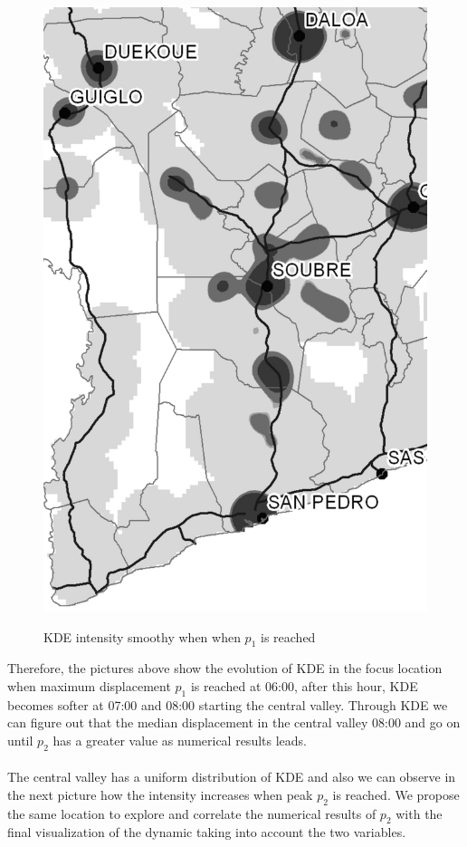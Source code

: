 \begin{figure}[h!]
{    \includegraphics[scale = 0.1]{results/images/kernel/l_hour8_kd_detail.pdf}
	\label{fig:subfig2_detail}
}
\caption[KDE intensity dynamic when $p_1$ is reached and central valley starts]{KDE intensity smoothy when when  $p_1$ is reached}
\label{fig:subfigureExample}
\end{figure}


Therefore, the pictures above show the evolution of KDE in the focus location when maximum displacement $p_1$ is reached at 06:00, after this hour, KDE becomes softer at 07:00 and 08:00 starting the central valley. Through KDE  we can figure out that the median displacement in the central valley 08:00 and go on until $p_2$ has a greater value as numerical results leads.
\\
\\
The central valley has a uniform distribution of KDE and also we can observe in the next picture how the intensity increases when peak $p_2$ is reached. We propose the same location to explore and correlate the numerical results of $p_2$ with the final visualization of the dynamic taking into account the two variables.




